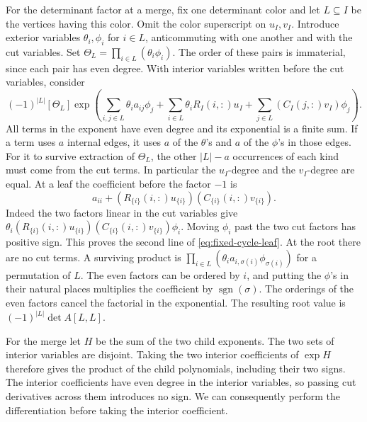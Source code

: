 \documentclass[11pt,reqno]{amsart}
\theoremstyle{remark}
\numberwithin{equation}{section}
\begin{document}
For the determinant factor at a merge, fix one determinant color and let
\(L\subseteq I\) be the vertices having this color. Omit the color
superscript on \(u_I,v_I\). Introduce exterior variables
\(\theta_i,\phi_i\) for \(i\in L\), anticommuting with one another and
with the cut variables. Set \(\Theta_L=\prod_{i\in L}(\theta_i\phi_i)\).
The order of these pairs is immaterial, since each pair has even degree.
With interior variables written before the cut variables, consider
\begin{equation}\label{eq:fixed-cycle-partial}
 (-1)^{|L|}[\Theta_L]\exp\!\left(
 \sum_{i,j\in L}\theta_i a_{ij}\phi_j
 +\sum_{i\in L}\theta_i R_I(i,:)u_I
 +\sum_{j\in L}(C_I(j,:)v_I)\phi_j\right).
\end{equation}
All terms in the exponent have even degree and its exponential is a
finite sum. If a term uses \(a\) internal edges, it uses \(a\) of the
\(\theta\)'s and \(a\) of the \(\phi\)'s in those edges. For it to
survive extraction of \(\Theta_L\), the other \(|L|-a\) occurrences of
each kind must come from the cut terms. In particular the \(u_I\)-degree
and the \(v_I\)-degree are equal. At a leaf the coefficient before the
factor \(-1\) is
\[
 a_{ii}+(R_{\{i\}}(i,:)u_{\{i\}})(C_{\{i\}}(i,:)v_{\{i\}}).
\]
Indeed the two factors linear in the cut variables give
\(\theta_i(R_{\{i\}}(i,:)u_{\{i\}}) (C_{\{i\}}(i,:)v_{\{i\}})\phi_i\).
Moving \(\phi_i\) past the two cut factors has positive sign. This proves
the second line of \eqref{eq:fixed-cycle-leaf}. At the root there are no
cut terms. A surviving product is \(\prod_{i\in L}(\theta_i
a_{i,\sigma(i)}\phi_{\sigma(i)})\) for a permutation of \(L\). The even
factors can be ordered by \(i\), and putting the \(\phi\)'s in their
natural places multiplies the coefficient by
\(\operatorname{sgn}(\sigma)\). The orderings of the even factors cancel
the factorial in the exponential. The resulting root value is
\((-1)^{|L|}\det A[L,L]\).

For the merge let \(H\) be the sum of the two child exponents. The two
sets of interior variables are disjoint. Taking the two interior
coefficients of \(\exp H\) therefore gives the product of the child
polynomials, including their two signs. The interior coefficients have
even degree in the interior variables, so passing cut derivatives across
them introduces no sign. We can consequently perform the differentiation
before taking the interior coefficient.
\end{document}
